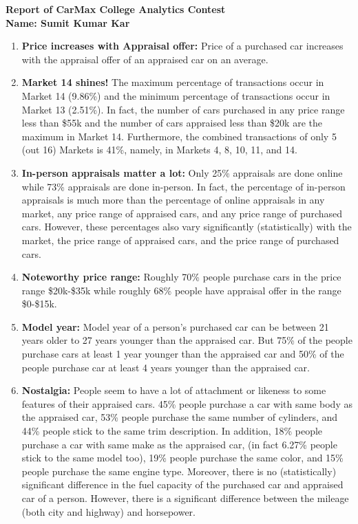 \documentclass[12 pt]{article}
\begin{document}
	

\begin{center}
	\textbf{\Large{Report of CarMax College Analytics Contest}\\\large{Name: Sumit Kumar Kar}}
\end{center}

\begin{enumerate}
\item \textbf{Price increases with Appraisal offer:} Price of a purchased car increases with the appraisal offer of an appraised car on an average.
\item \textbf{Market 14 shines!} The maximum percentage of transactions occur in Market 14 (9.86\%) and the minimum percentage of transactions occur in Market 13 (2.51\%). In fact, the number of cars purchased in any price range less than \$55k and the number of cars appraised less than \$20k are the maximum in Market 14. Furthermore, the combined transactions of only 5 (out 16) Markets is 41\%, namely, in Markets 4, 8, 10, 11, and 14. 
\item \textbf{In-person appraisals matter a lot:} Only 25\% appraisals are done online while 73\% appraisals are done in-person. In fact, the percentage of in-person appraisals is much more than the percentage of online appraisals in any market, any price range of appraised cars, and any price range of purchased cars. However, these percentages also vary significantly (statistically) with the market, the price range of appraised cars, and the price range of purchased cars.
\item \textbf{Noteworthy price range:} Roughly 70\% people purchase cars in the price range \$20k-\$35k while roughly 68\% people have appraisal offer in the range \$0-\$15k.
\item \textbf{Model year:} Model year of a person’s purchased car can be between 21 years older to 27 years younger than the appraised car. But 75\% of the people purchase cars at least 1 year younger than the appraised car and 50\% of the people purchase car at least 4 years younger than the appraised car.
\item \textbf{Nostalgia:} People seem to have a lot of attachment or likeness to some features of their appraised cars. 45\% people purchase a car with same body as the appraised car, 53\% people purchase the same number of cylinders, and 44\% people stick to the same trim description. In addition, 18\% people purchase a car with same make as the appraised car, (in fact 6.27\% people stick to the same model too), 19\% people purchase the same color, and 15\% people purchase the same engine type. Moreover, there is no (statistically) significant difference in the fuel capacity of the purchased car and appraised car of a person. However, there is a significant difference between the mileage (both city and highway) and horsepower.

\end{enumerate}
\end{document}
